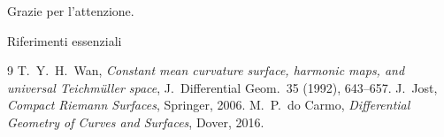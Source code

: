 \documentclass[aspectratio=169,11pt]{beamer}
\begin{document}
\begin{frame}
  \vfill
  \begin{center}
    \Huge Grazie per l'attenzione.
  \end{center}
  \vfill
\end{frame}


\begin{frame}[allowframebreaks]{Riferimenti essenziali}
\footnotesize
\begin{thebibliography}{9}
 T.~Y.~H.~Wan, \emph{Constant mean curvature surface,
  harmonic maps, and universal Teichmüller space}, J.\ Differential
  Geom.\ 35 (1992), 643--657.
 J.~Jost, \emph{Compact Riemann Surfaces}, Springer, 2006.
 M.~P.\ do Carmo, \emph{Differential Geometry of
  Curves and Surfaces}, Dover, 2016.
\end{thebibliography}
\end{frame}
\end{document}
